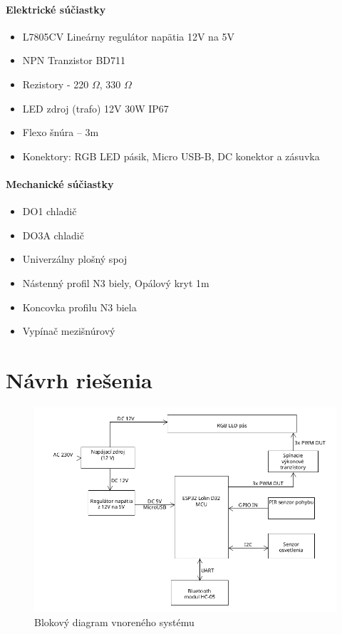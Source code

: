 \documentclass[12pt, a4paper]{article}
\begin{document}
\paragraph{Elektrické súčiastky}
\begin{itemize}
\itemsep0pt
\item L7805CV Lineárny regulátor napätia 12V na 5V
\item NPN Tranzistor BD711 
\item Rezistory - 220 $\Omega$, 330 $\Omega$
\item LED zdroj (trafo) 12V 30W IP67
\item Flexo šnúra – 3m
\item Konektory: RGB LED pásik, Micro USB-B, DC konektor a zásuvka
\end{itemize}

\paragraph{Mechanické súčiastky}
\begin{itemize}
\itemsep0pt
\item DO1 chladič
\item DO3A chladič
\item Univerzálny plošný spoj
\item Nástenný profil N3 biely, Opálový kryt 1m
\item Koncovka profilu N3 biela
\item Vypínač mezišnúrový
\end{itemize}

\section{Návrh riešenia}
\begin{figure}
	\centering
	\includegraphics[width=\textwidth]{assets/block-diagram.png}
	\caption{Blokový diagram vnoreného systému}
\end{figure}
\end{document}
